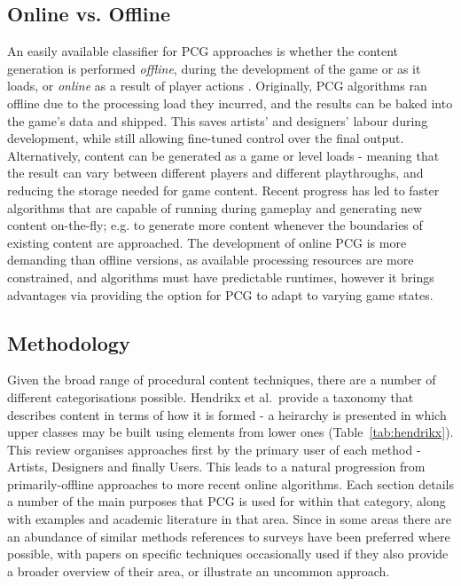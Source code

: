 \documentclass{acm_proc_article-sp}
\begin{document}
\subsection{Online vs. Offline}
An easily available classifier for PCG approaches is whether the content generation is performed \textit{offline}, during the development of the game or as it loads, or \textit{online} as a result of player actions \cite{togelius2011search}. Originally, PCG algorithms ran offline due to the processing load they incurred, and the results can be baked into the game's data and shipped. This saves artists' and designers' labour during development, while still allowing fine-tuned control over the final output. Alternatively, content can be generated as a game or level loads - meaning that the result can vary between different players and different playthroughs, and reducing the storage needed for game content. Recent progress has led to faster algorithms that are capable of running during gameplay and generating new content on-the-fly; e.g. to generate more content whenever the boundaries of existing content are approached. The development of online PCG is more demanding than offline versions, as available processing resources are more constrained, and algorithms must have predictable runtimes, however it brings advantages via providing the option for PCG to adapt to varying game states.

\subsection{Methodology}
Given the broad range of procedural content techniques, there are a number of different categorisations possible. Hendrikx et al.\ provide a taxonomy that describes content in terms of how it is formed - a heirarchy is presented in which upper classes may be built using elements from lower ones (Table~\ref{tab:hendrikx}).
This review organises approaches first by the primary user of each method - Artists, Designers and finally Users. This leads to a natural progression from primarily-offline approaches to more recent online algorithms. Each section details a number of the main purposes that PCG is used for within that category, along with examples and academic literature in that area. Since in some areas there are an abundance of similar methods references to surveys have been preferred where possible, with papers on specific techniques occasionally used if they also provide a broader overview of their area, or illustrate an uncommon approach.
\end{document}
